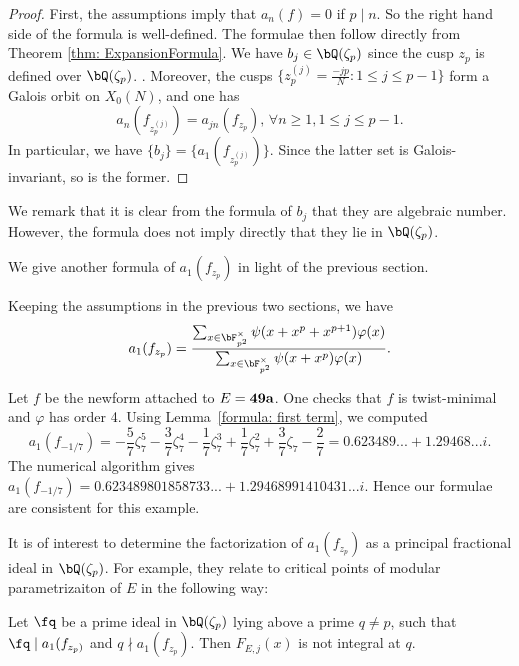 \documentclass [11pt, proquest] {uwthesis}[2015/03/03]
\begin{document}
\begin{proof}
First, the assumptions imply that $a_{n}(f) =  0$ if $p \mid n$. So the right hand side of the formula is well-defined. 
The formulae then follow directly from Theorem \ref{thm: ExpansionFormula}.   We have $b_j \in \bQ(\zeta_p)$ since the cusp $z_p$ is defined over $\bQ(\zeta_p)$. . Moreover, the cusps $\{z_p^{(j)} = \frac{-jp}{N}: 1 \leq j \leq p-1\}$ form a Galois orbit on $X_0(N)$, and one has 
\[
	a_n(f_{z_p^{(j)}}) = a_{jn}(f_{z_p}), \, \forall n \geq 1, 1 \leq j \leq p-1. 
\]
In particular, we have $\{b_j\} = \{a_1(f_{z_p^{(j)}})\}$. Since the latter set is Galois-invariant, so is the former. 
\end{proof}

We remark that it is clear from the formula of $b_j$ that they are algebraic number. However, the formula does not imply directly that they lie in $\bQ(\zeta_p)$. 

We give another formula of $a_1(f_{z_p})$ in light of the previous section. 

\begin{Lemma} \label{formula: first term}
Keeping the assumptions in the previous two sections, we have 
$$a_1(f_{z_p}) = \frac{\sum_{x \in \bF_{p^2}^{\times}} \psi(x+x^p+x^{p+1}) \varphi(x)}{\sum_{x \in \bF_{p^2}^{\times} }\psi(x+x^p) \varphi(x)}. $$
\end{Lemma}

\begin{Example}
Let $f$ be the newform attached to $E  =\bf{49a}$. One checks that $f$ is twist-minimal and $\varphi$ has order 4. Using Lemma~\ref{formula: first term}, we computed $$a_1(f_{-1/7}) = -\frac{5}{7} \zeta_{7}^{5} - \frac{3}{7} \zeta_{7}^{4} - \frac{1}{7} \zeta_{7}^{3} + \frac{1}{7} \zeta_{7}^{2} + \frac{3}{7} \zeta_{7} - \frac{2}{7} = 0.623489... + 1.29468...i. $$
The numerical algorithm gives $a_1(f_{-1/7}) = 0.623489801858733...+ 1.29468991410431...i$. Hence our formulae are 
consistent for this example.
\end{Example}


It is of interest to determine the factorization of $a_1(f_{z_p})$ as a principal fractional ideal in $\bQ(\zeta_p)$. For example, they relate to critical points of modular parametrizaiton of $E$ in the following way:
\begin{Lemma}
Let $\fq$ be a prime ideal in $\bQ(\zeta_p)$ lying above a prime $q \neq p$, such that $\fq \mid a_1(f_{z_p)}$ and $q \nmid a_1(f_{z_p})$. Then $F_{E,j}(x)$ is not integral at $q$.
\end{Lemma}
\end{document}
